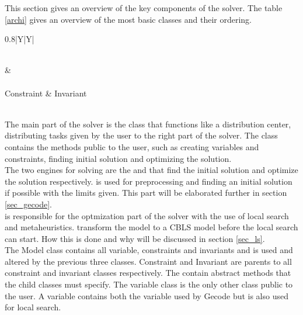This section gives an overview of the key components of the solver. The table \ref{archi} gives an overview of the most 
basic classes and their ordering. \\ 
\begin{table}[b]
\Large
\def\arraystretch{1.5}
\centering
\label{keyStruc}
\begin{tabularx}{0.8\textwidth}{|Y|Y|}%

\hline
{}  \\ \hline
\gecodesol      & \lssol       \\ \hline
{}    \\ \hline
Constraint      & Invariant    \\ \hline
{} \\ \hline
\end{tabularx}\caption{Ordering of key classes} \label{archi}
\end{table}
\noindent
The main part of the solver is the \gensol class that functions like a distribution center, distributing tasks given 
by the user to the right part of the solver. The \gensol class contains 
the methods public to the user, such as creating variables and constraints, finding initial solution and optimizing the 
solution. \\ 
The two engines for solving are the \gecodesol and \lssol that find the initial solution and optimize the solution 
respectively. \gecodesol is used for preprocessing and finding an initial solution if possible with the limits given. 
This part will be elaborated further in section \ref{sec_gecode}. \\
\lssol is responsible for the optmization part of the solver with the use of local search and metaheuristics. \lssol 
transform the model to a CBLS model before the local search can start. How this is done and why will be discussed in 
section \ref{sec_ls}. \\ 
The Model class contains all variable, constraints and invariants and is used and altered by the previous three 
classes. Constraint and Invariant are parents to all constraint and invariant classes respectively. The contain 
abstract methods that the child classes must specify. The variable class is the only other class public to the user. A 
variable contains both the variable used by Gecode but is also used for local search. \\



